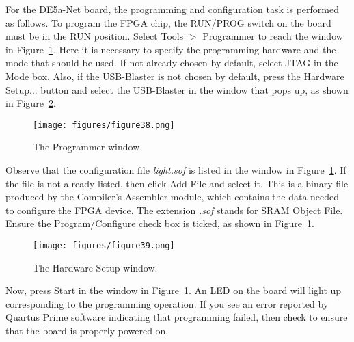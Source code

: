 For the DE5a-Net board, the
programming and configuration task is performed as follows. 
To program the FPGA chip, the RUN/PROG switch on the board must be in the RUN position.
Select {\sf Tools $>$ Programmer} to reach the window in Figure~\ref{fig:38}.
Here it is necessary to specify the programming hardware and 
the mode that should be used. If not already chosen by default, 
select JTAG in the Mode box.
Also, if the USB-Blaster is not chosen by default, press the 
{\sf Hardware Setup...} button and select the USB-Blaster in the window
that pops up, as shown in Figure~\ref{fig:39}.

\begin{figure}[H]
   \begin{center}
      \texttt{[image: figures/figure38.png]}
   \caption{The Programmer window.} 
	 \label{fig:38}
	 \end{center}
\end{figure}

Observe that the configuration file {\it light.sof} is listed in the window in
Figure~\ref{fig:38}. If the file is not already listed, then click {\sf Add File}
and select it.
This is a binary file produced by the Compiler's Assembler module, 
which contains the data needed to configure the FPGA device.
The extension {\it .sof} stands for SRAM Object File.
Ensure the {\sf Program/Configure} check box is ticked, as shown in Figure~\ref{fig:38}.

\begin{figure}[H]
   \begin{center}
      \texttt{[image: figures/figure39.png]}
   \caption{The Hardware Setup window.} 
	 \label{fig:39}
	 \end{center}
\end{figure}

Now, press {\sf Start} in the window in Figure~\ref{fig:38}.
An LED on the board will light up corresponding to the programming operation.
If you see an error reported by Quartus Prime software indicating that
programming failed, then check to ensure that the board is properly powered on.
